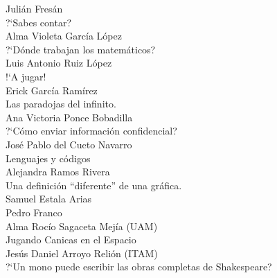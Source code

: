 Juli\'an Fres\'an\\
?`Sabes contar?\\

Alma Violeta Garc\'ia L\'opez\\
?`D\'onde trabajan los matem\'aticos?\\

Luis Antonio Ruiz L\'opez\\
!`A jugar!\\

Erick Garc\'ia Ram\'irez\\
Las paradojas del infinito.\\

Ana Victoria Ponce Bobadilla\\
?`C\'omo enviar informaci\'on confidencial?\\

Jos\'e Pablo del Cueto Navarro\\
Lenguajes y c\'odigos\\

Alejandra Ramos Rivera\\
Una definici\'on ``diferente'' de una gr\'afica.\\

Samuel Estala Arias\\

Pedro Franco\\

Alma Roc\'io Sagaceta Mej\'ia  (UAM)\\
Jugando Canicas en el Espacio\\

Jes\'us Daniel Arroyo Reli\'on (ITAM)\\
?`Un mono puede escribir las obras completas de Shakespeare?\\
